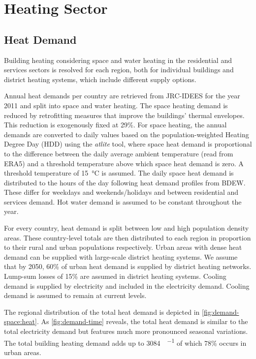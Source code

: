 \section{Heating Sector}
\label{sec:si:heat}

\subsection{Heat Demand}
\label{sec:si:heat:demand}

Building heating considering space and water heating in the residential and
services sectors is resolved for each region, both for individual buildings and
district heating systems, which include different supply options.

Annual heat demands per country are retrieved from JRC-IDEES for
the year 2011 and split into space and water heating. The space heating demand
is reduced by retrofitting measures that improve the buildings' thermal
envelopes. This reduction is exogenously fixed at 29\%. For space
heating, the annual demands are converted to daily values based on the
population-weighted Heating Degree Day (HDD) using the \textit{atlite} tool,
 where space heat demand is proportional to the difference between the
daily average ambient temperature (read from ERA5) and a threshold
temperature above which space heat demand is zero. A threshold temperature of
\SI{15}{\celsius} is assumed. The daily space heat demand is distributed to the
hours of the day following heat demand profiles from BDEW. These differ
for weekdays and weekends/holidays and between residential and services demand.
Hot water demand is assumed to be constant throughout the year.

For every country, heat demand is split between low and high population density
areas. These country-level totals are then distributed to each region in
proportion to their rural and urban populations respectively. Urban areas with
dense heat demand can be supplied with large-scale district heating systems. We
assume that by 2050, 60\% of urban heat demand is supplied by district heating
networks. Lump-sum losses of 15\% are assumed in district heating systems.
Cooling demand is supplied by electricity and included in the electricity
demand. Cooling demand is assumed to remain at current levels.

The regional distribution of the total heat demand is depicted in
\cref{fig:demand-space:heat}. As \cref{fig:demand-time} reveals, the total heat
demand is similar to the total electricity demand but features much more
pronounced seasonal variations. The total building heating demand adds up to
\SI{3084}{\twh\per\year} of which 78\% occurs in urban areas.

